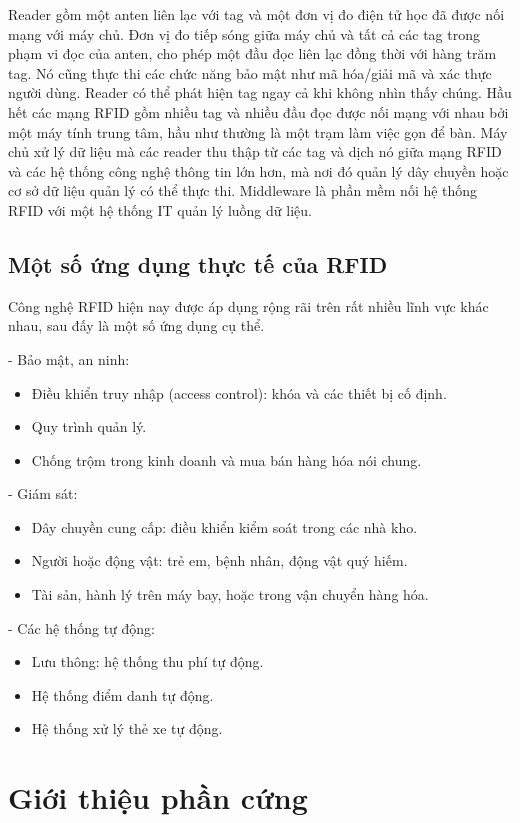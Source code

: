 Reader gồm một anten liên lạc với tag và một đơn vị đo điện tử học đã được nối mạng với máy chủ.
Đơn vị đo tiếp sóng giữa máy chủ và tất cả các tag trong phạm vi đọc của anten, cho phép một đầu đọc liên lạc đồng thời với hàng trăm tag.
Nó cũng thực thi các chức năng bảo mật như mã hóa/giải mã và xác thực người dùng.
Reader có thể phát hiện tag ngay cả khi không nhìn thấy chúng.
Hầu hết các mạng RFID gồm nhiều tag và nhiều đầu đọc được nối mạng với nhau bởi một máy tính trung tâm, hầu như thường là một trạm làm việc gọn để bàn.
Máy chủ xử lý dữ liệu mà các reader thu thập từ các tag và dịch nó giữa mạng RFID và các hệ thống công nghệ thông tin lớn hơn,
mà nơi đó quản lý dây chuyền hoặc cơ sở dữ liệu quản lý có thể thực thi.
Middleware là phần mềm nối hệ thống RFID với một hệ thống IT quản lý luồng dữ liệu.

\subsection{Một số ứng dụng thực tế của RFID}
Công nghệ RFID hiện nay được áp dụng rộng rãi trên rất nhiều lĩnh vực khác nhau, sau đấy là một số ứng dụng cụ thể.

- Bảo mật, an ninh:
\begin{itemize}
    \item Điều khiển truy nhập (access control): khóa và các thiết bị cố định.
    \item Quy trình quản lý.
    \item Chống trộm trong kinh doanh và mua bán hàng hóa nói chung.
\end{itemize}
- Giám sát:
\begin{itemize}
    \item Dây chuyền cung cấp: điều khiển kiểm soát trong các nhà kho.
    \item Người hoặc động vật: trẻ em, bệnh nhân, động vật quý hiếm.
    \item Tài sản, hành lý trên máy bay, hoặc trong vận chuyển hàng hóa.
\end{itemize}
- Các hệ thống tự động:
\begin{itemize}
    \item Lưu thông: hệ thống thu phí tự động.
    \item Hệ thống điểm danh tự động.
    \item Hệ thống xử lý thẻ xe tự động.
\end{itemize}

\section{Giới thiệu phần cứng}
